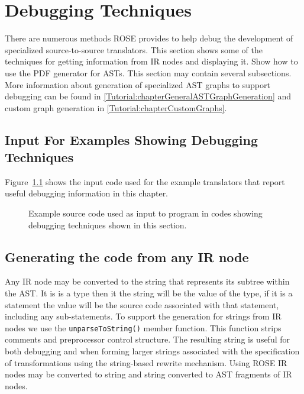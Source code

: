 \chapter{Debugging Techniques}
     There are numerous methods ROSE provides to help debug the 
development of specialized source-to-source translators.
This section shows some of the techniques for getting
information from IR nodes and displaying it.  Show how to 
use the PDF generator for ASTs.  This section may
contain several subsections.
More information about generation of specialized AST graphs to support debugging 
can be found in \ref{Tutorial:chapterGeneralASTGraphGeneration} and custom 
graph generation in \ref{Tutorial:chapterCustomGraphs}.

\section{Input For Examples Showing Debugging Techniques}

   Figure~\ref{Tutorial:exampleInputCode_ExampleDebugging}
shows the input code used for the example translators that
report useful debugging information in this chapter.

\begin{figure}[!h]
{\indent
{\mySmallFontSize

\begin{latexonly}
   
\end{latexonly}

\begin{htmlonly}
   
\end{htmlonly}

}
}
\caption{Example source code used as input to program in
         codes showing debugging techniques shown in this section.}
\label{Tutorial:exampleInputCode_ExampleDebugging}
\end{figure}


\section{Generating the code from any IR node}

     Any IR node may be converted to the string that represents
its subtree within the AST.  It is is a type then it the string will be 
the value of the type, if it is a statement the value will be the 
source code associated with that statement, including any sub-statements.
To support the generation for strings from IR nodes we use the
{\tt unparseToString()} member function.  This function strips
comments and preprocessor control structure.  The resulting string is useful
for both debugging and when forming larger strings associated with the
specification of transformations using the string-based rewrite mechanism.
Using ROSE IR nodes may be converted to string and string converted to 
AST fragments of IR nodes.

